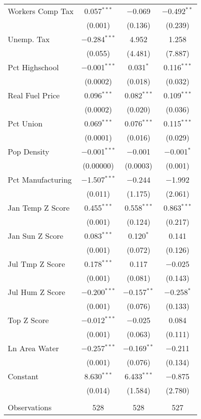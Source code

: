 \begin{table}[!htbp]
\begin{tabular}{@{\extracolsep{5pt}}lccc}
  Workers Comp Tax & 0.057$^{***}$ & $-$0.069 & $-$0.492$^{**}$ \\ 
  & (0.001) & (0.136) & (0.239) \\ 
  Unemp. Tax & $-$0.284$^{***}$ & 4.952 & 1.258 \\ 
  & (0.055) & (4.481) & (7.887) \\ 
  Pct Highschool & $-$0.001$^{***}$ & 0.031$^{*}$ & 0.116$^{***}$ \\ 
  & (0.0002) & (0.018) & (0.032) \\ 
  Real Fuel Price & 0.096$^{***}$ & 0.082$^{***}$ & 0.109$^{***}$ \\ 
  & (0.0002) & (0.020) & (0.036) \\ 
  Pct Union & 0.069$^{***}$ & 0.076$^{***}$ & 0.115$^{***}$ \\ 
  & (0.0001) & (0.016) & (0.029) \\ 
  Pop Density & $-$0.001$^{***}$ & $-$0.001 & $-$0.001$^{*}$ \\ 
  & (0.00000) & (0.0003) & (0.001) \\ 
  Pct Manufacturing & $-$1.507$^{***}$ & $-$0.244 & $-$1.992 \\ 
  & (0.011) & (1.175) & (2.061) \\ 
  Jan Temp Z Score & 0.455$^{***}$ & 0.558$^{***}$ & 0.863$^{***}$ \\ 
  & (0.001) & (0.124) & (0.217) \\ 
  Jan Sun Z Score & 0.083$^{***}$ & 0.120$^{*}$ & 0.141 \\ 
  & (0.001) & (0.072) & (0.126) \\ 
  Jul Tmp Z Score & 0.178$^{***}$ & 0.117 & $-$0.025 \\ 
  & (0.001) & (0.081) & (0.143) \\ 
  Jul Hum Z Score & $-$0.200$^{***}$ & $-$0.157$^{**}$ & $-$0.258$^{*}$ \\ 
  & (0.001) & (0.076) & (0.133) \\ 
  Top Z Score & $-$0.012$^{***}$ & $-$0.025 & 0.084 \\ 
  & (0.001) & (0.063) & (0.111) \\ 
  Ln Area Water & $-$0.257$^{***}$ & $-$0.169$^{**}$ & $-$0.211 \\ 
  & (0.001) & (0.076) & (0.134) \\ 
  Constant & 8.630$^{***}$ & 6.433$^{***}$ & $-$0.875 \\ 
  & (0.014) & (1.584) & (2.780) \\ 
 \hline \\[-1.8ex] 
Observations & 528 & 528 & 527 \\ 

\end{tabular}
\end{table}
